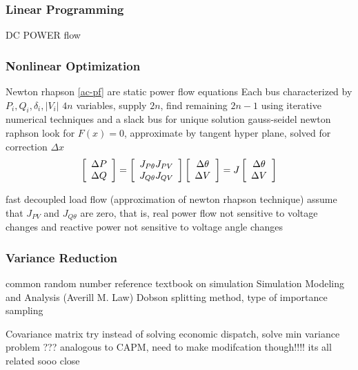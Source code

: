 \subsubsection{Linear Programming}
DC POWER flow

\subsubsection{Nonlinear Optimization}
Newton rhapson
\ref{ac-pf} are static power flow equations
Each bus characterized by $P_i, Q_i, \delta_i, |V_i|$
$4 n$ variables, supply $2 n$, find remaining $2 n -1$ using iterative numerical techniques and a slack bus for unique solution
gauss-seidel
newton raphson  look for $F(x) = 0$, approximate by tangent hyper plane, solved for correction $\Delta x$
\begin{equation}
\left[ \begin{array}{ c } \Delta P \\ \Delta Q \end{array}	\right]
=
\left[ \begin{array}{ c c } J_{P \theta} J_{PV} \\ J_{Q \theta} J_{QV} \end{array}	\right]
\left[ \begin{array}{ c } \Delta \theta \\ \Delta V \end{array}	\right]
=
J \left[ \begin{array}{ c } \Delta \theta \\ \Delta V \end{array}	\right]
\end{equation}

fast decoupled load flow (approximation of newton rhapson technique)
assume that $J_{PV}$ and $J_{Q\theta}$ are zero, that is, real power flow not sensitive to voltage changes and reactive power not sensitive to voltage angle changes


\subsubsection{Variance Reduction}
common random number
reference textbook on simulation Simulation Modeling and Analysis (Averill M. Law) \cite{law_2007}
Dobson splitting method, type of importance sampling

Covariance matrix
try instead of solving economic dispatch, solve min variance problem ??? analogous to CAPM, need to make modifcation though!!!! its all related sooo close


